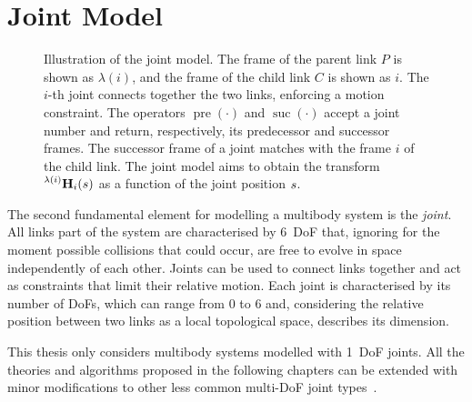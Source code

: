 \section{Joint Model}
\label{section:joint_model}

\begin{figure}
    \centering
    \caption{Illustration of the joint model. The frame of the parent link $P$ is shown as $\lambda(i)$, and the frame of the child link $C$ is shown as $i$. The $i$-th joint connects together the two links, enforcing a motion constraint. The operators $\operatorname{pre}(\cdot)$ and $\operatorname{suc}(\cdot)$ accept a joint number and return, respectively, its predecessor and successor frames. The successor frame of a joint matches with the frame $i$ of the child link. The joint model aims to obtain the transform $\homo[\lambda(i)]_i(\shape)$ as a function of the joint position $\shape$.}
    \label{fig:joint_model}
\end{figure}

The second fundamental element for modelling a multibody system is the \emph{joint}.
All links part of the system are characterised by 6~\ac{DoF} that, ignoring for the moment possible collisions that could occur, are free to evolve in space independently of each other.
Joints can be used to connect links together and act as constraints that limit their relative motion.
Each joint is characterised by its number of \acp{DoF}, which can range from 0 to 6 and, considering the relative position between two links as a local topological space, describes its dimension.

\begin{assumption*}
%
This thesis only considers multibody systems modelled with 1~\ac{DoF} joints.
All the theories and algorithms proposed in the following chapters can be extended with minor modifications to other less common multi-\ac{DoF} joint types~\parencite{featherstone_rigid_2008}.
%
\end{assumption*}

